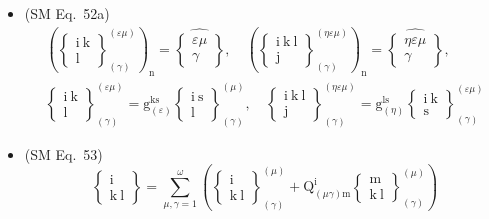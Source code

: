 \documentclass[12pt]{article}
\begin{document}
\begin{itemize}[label={},leftmargin=0pt]
    \item (SM Eq.\ 52a) 
    \[
    \begin{gathered}
    \left( \left\{ \begin{smallmatrix} \mathrm{i\ k} \\ \mathrm{l} \end{smallmatrix} \right\}^{(\varepsilon\mu)}_{(\gamma)} \right)_\mathrm{n} = \widehat{\left\{ \begin{smallmatrix} \varepsilon\mu \\ \gamma \end{smallmatrix} \right\}}, \quad \left( \left\{ \begin{smallmatrix} \mathrm{i\ k\ l} \\ \mathrm{j} \end{smallmatrix} \right\}^{(\eta\varepsilon\mu)}_{(\gamma)} \right)_\mathrm{n} = \widehat{\left\{ \begin{smallmatrix} \eta\varepsilon\mu \\ \gamma \end{smallmatrix} \right\}}, \\
    \left\{ \begin{smallmatrix} \mathrm{i\ k} \\ \mathrm{l} \end{smallmatrix} \right\}^{(\varepsilon\mu)}_{(\gamma)} = \mathrm{g}_{(\varepsilon)}^{\mathrm{ks}}\left\{ \begin{smallmatrix} \mathrm{i\ s} \\ \mathrm{l} \end{smallmatrix} \right\}^{(\mu)}_{(\gamma)}, \quad \left\{ \begin{smallmatrix} \mathrm{i\ k\ l} \\ \mathrm{j} \end{smallmatrix} \right\}^{(\eta\varepsilon\mu)}_{(\gamma)} = \mathrm{g}_{(\eta)}^{\mathrm{ls}}\left\{ \begin{smallmatrix} \mathrm{i\ k} \\ \mathrm{s} \end{smallmatrix} \right\}^{(\varepsilon\mu)}_{(\gamma)}
    \end{gathered}
    \]

    \item (SM Eq.\ 53) 
    \[
    \left\{ \begin{smallmatrix} \mathrm{i} \\ \mathrm{k\ l} \end{smallmatrix} \right\} = \sum_{\mu,\gamma=1}^\omega \left( \left\{ \begin{smallmatrix} \mathrm{i} \\ \mathrm{k\ l} \end{smallmatrix} \right\}^{(\mu)}_{(\gamma)} + \mathrm{Q}^\mathrm{i}_{(\mu\gamma)\mathrm{m}} \left\{ \begin{smallmatrix} \mathrm{m} \\ \mathrm{k\ l} \end{smallmatrix} \right\}^{(\mu)}_{(\gamma)} \right)
    \]


\end{itemize}
\end{document}
